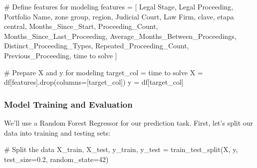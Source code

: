 \documentclass[
  letterpaper,
  DIV=11,
  numbers=noendperiod]{scrartcl}
\newenvironment{Shaded}{\begin{snugshade}}{\end{snugshade}}
\newcommand{\CommentTok}[1]{\textcolor[rgb]{0.37,0.37,0.37}{#1}}
\newcommand{\DecValTok}[1]{\textcolor[rgb]{0.68,0.00,0.00}{#1}}
\newcommand{\FloatTok}[1]{\textcolor[rgb]{0.68,0.00,0.00}{#1}}
\newcommand{\NormalTok}[1]{\textcolor[rgb]{0.00,0.23,0.31}{#1}}
\newcommand{\OperatorTok}[1]{\textcolor[rgb]{0.37,0.37,0.37}{#1}}
\newcommand{\StringTok}[1]{\textcolor[rgb]{0.13,0.47,0.30}{#1}}
\begin{document}
\begin{Shaded}
\begin{Highlighting}[]
\CommentTok{\# Define features for modeling}
\NormalTok{features }\OperatorTok{=}\NormalTok{ [}
    \StringTok{\textquotesingle{}Legal Stage\textquotesingle{}}\NormalTok{, }\StringTok{\textquotesingle{}Legal Proceeding\textquotesingle{}}\NormalTok{, }\StringTok{\textquotesingle{}Portfolio Name\textquotesingle{}}\NormalTok{, }\StringTok{\textquotesingle{}zone group\textquotesingle{}}\NormalTok{, }\StringTok{\textquotesingle{}region\textquotesingle{}}\NormalTok{,}
    \StringTok{\textquotesingle{}Judicial Court\textquotesingle{}}\NormalTok{, }\StringTok{\textquotesingle{}Law Firm\textquotesingle{}}\NormalTok{, }\StringTok{\textquotesingle{}clave\textquotesingle{}}\NormalTok{, }\StringTok{\textquotesingle{}etapa central\textquotesingle{}}\NormalTok{, }\StringTok{\textquotesingle{}Months\_Since\_Start\textquotesingle{}}\NormalTok{,}
    \StringTok{\textquotesingle{}Proceeding\_Count\textquotesingle{}}\NormalTok{, }\StringTok{\textquotesingle{}Months\_Since\_Last\_Proceeding\textquotesingle{}}\NormalTok{, }\StringTok{\textquotesingle{}Average\_Months\_Between\_Proceedings\textquotesingle{}}\NormalTok{,}
    \StringTok{\textquotesingle{}Distinct\_Proceeding\_Types\textquotesingle{}}\NormalTok{, }\StringTok{\textquotesingle{}Repeated\_Proceeding\_Count\textquotesingle{}}\NormalTok{, }\StringTok{\textquotesingle{}Previous\_Proceeding\textquotesingle{}}\NormalTok{,}
    \StringTok{\textquotesingle{}time to solve\textquotesingle{}}
\NormalTok{]}

\CommentTok{\# Prepare X and y for modeling}
\NormalTok{target\_col }\OperatorTok{=} \StringTok{\textquotesingle{}time to solve\textquotesingle{}}
\NormalTok{X }\OperatorTok{=}\NormalTok{ df[features].drop(columns}\OperatorTok{=}\NormalTok{[target\_col])}
\NormalTok{y }\OperatorTok{=}\NormalTok{ df[target\_col]}
\end{Highlighting}
\end{Shaded}

\subsubsection{Model Training and Evaluation}\label{sec-model-training}

We'll use a Random Forest Regressor for our prediction task. First,
let's split our data into training and testing sets:

\begin{Shaded}
\begin{Highlighting}[]
\CommentTok{\# Split the data}
\NormalTok{X\_train, X\_test, y\_train, y\_test }\OperatorTok{=}\NormalTok{ train\_test\_split(X, y, test\_size}\OperatorTok{=}\FloatTok{0.2}\NormalTok{, random\_state}\OperatorTok{=}\DecValTok{42}\NormalTok{)}
\end{Highlighting}
\end{Shaded}
\end{document}
